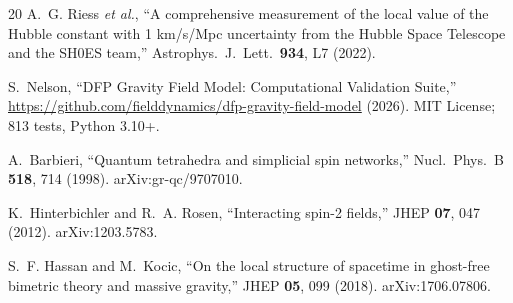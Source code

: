 \documentclass[aps,prd,preprint,superscriptaddress,showpacs,preprintnumbers,amsmath,amssymb,nofootinbib]{revtex4-2}
\begin{document}
\begin{thebibliography}{20}
A.~G. Riess \textit{et al.}, ``A comprehensive measurement of the local value of the Hubble constant with 1 km/s/Mpc uncertainty from the Hubble Space Telescope and the SH0ES team,'' Astrophys.\ J.\ Lett.\ \textbf{934}, L7 (2022).

S.~Nelson, ``DFP Gravity Field Model: Computational Validation Suite,'' \url{https://github.com/fielddynamics/dfp-gravity-field-model} (2026). MIT License; 813 tests, Python 3.10+.

A.~Barbieri, ``Quantum tetrahedra and simplicial spin networks,'' Nucl.\ Phys.\ B \textbf{518}, 714 (1998). arXiv:gr-qc/9707010.

K.~Hinterbichler and R.~A. Rosen, ``Interacting spin-2 fields,'' JHEP \textbf{07}, 047 (2012). arXiv:1203.5783.

S.~F. Hassan and M.~Kocic, ``On the local structure of spacetime in ghost-free bimetric theory and massive gravity,'' JHEP \textbf{05}, 099 (2018). arXiv:1706.07806.

\end{thebibliography}
\end{document}
